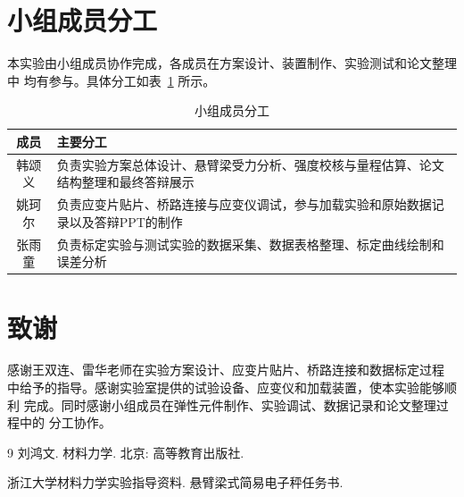 \documentclass[UTF8,a4paper,zihao=5]{ctexart}
\begin{document}
\section{小组成员分工}

本实验由小组成员协作完成，各成员在方案设计、装置制作、实验测试和论文整理中
均有参与。具体分工如表~\ref{tab:team-work} 所示。

\begin{table}[htbp]
  \centering
  \begin{tabular}{cp{10.5cm}}
    \toprule
    成员 & 主要分工 \\
    \midrule
    韩颂义 & 负责实验方案总体设计、悬臂梁受力分析、强度校核与量程估算、论文结构整理和最终答辩展示 \\
    姚珂尔 & 负责应变片贴片、桥路连接与应变仪调试，参与加载实验和原始数据记录以及答辩PPT的制作 \\
    张雨童 & 负责标定实验与测试实验的数据采集、数据表格整理、标定曲线绘制和误差分析 \\
    \bottomrule
  \end{tabular}
  \caption{小组成员分工}
  \label{tab:team-work}
\end{table}

\section{致谢}

感谢王双连、雷华老师在实验方案设计、应变片贴片、桥路连接和数据标定过程
中给予的指导。感谢实验室提供的试验设备、应变仪和加载装置，使本实验能够顺利
完成。同时感谢小组成员在弹性元件制作、实验调试、数据记录和论文整理过程中的
分工协作。

\begin{thebibliography}{9}
  刘鸿文. 材料力学. 北京: 高等教育出版社.

  浙江大学材料力学实验指导资料. 悬臂梁式简易电子秤任务书.
\end{thebibliography}
\end{document}
